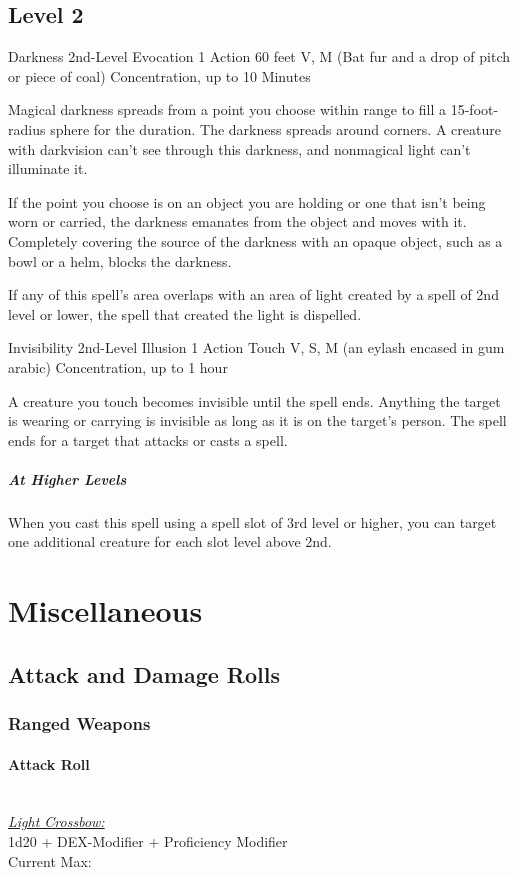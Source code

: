 {\subsection*{Level 2}

\DndSpellHeader
	{Darkness}
	{2nd-Level Evocation}
	{1 Action}
	{60 feet}
	{V, M (Bat fur and a drop of pitch or piece of coal)}
	{Concentration, up to 10 Minutes}
	
Magical darkness spreads from a point you choose within range to fill a 15-foot-radius sphere for the duration. The darkness spreads around corners. A creature with darkvision can't see through this darkness, and nonmagical light can't illuminate it.

If the point you choose is on an object you are holding or one that isn't being worn or carried, the darkness emanates from the object and moves with it. Completely covering the source of the darkness with an opaque object, such as a bowl or a helm, blocks the darkness.

If any of this spell's area overlaps with an area of light created by a spell of 2nd level or lower, the spell that created the light is dispelled.
	
\DndSpellHeader
	{Invisibility}
	{2nd-Level Illusion}
	{1 Action}
	{Touch}
	{V, S, M (an eylash encased in gum arabic)}
	{Concentration, up to 1 hour}

A creature you touch becomes invisible until the spell ends. Anything the target is wearing or carrying is invisible as long as it is on the target’s person. The spell ends for a target that attacks or casts a spell.

\subparagraph*{At Higher Levels} When you cast this spell using a spell slot of 3rd level or higher, you can target one additional creature for each slot level above 2nd.

\vfill\eject
\section*{Miscellaneous}
\subsection*{Attack and Damage Rolls}
\subsubsection*{Ranged Weapons}
\paragraph*{Attack Roll}\hfill\\
\underline{\textit{Light Crossbow:}}\\
1d20 + DEX-Modifier + Proficiency Modifier\\
\indent Current Max: 
}
